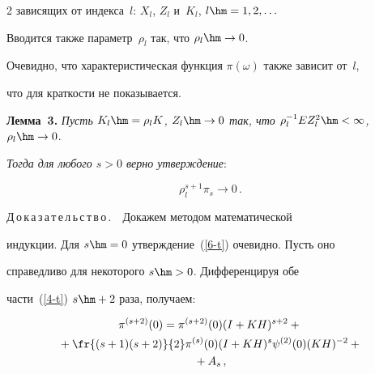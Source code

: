 \begin{multicols}{2}
зависящих от индекса~$l$: $X_l$, $Z_l$ и~$K_l$, $l\hm=1, 2,\ldots$

Вводится также параметр~$\rho_l$ так, что $\rho_l\hm\rightarrow 0$.

Очевидно, что характеристическая функция $\pi(\omega)$ также зависит от~$l$,

что для краткости не показывается.



\smallskip



\noindent

\textbf{Лемма~3.} \textit{Пусть $K_l\hm=\rho_l K$, $Z_l \hm\rightarrow 0$ так, что $\rho_l^{-1} EZ_l^2\hm < \infty$, $\rho_l\hm \rightarrow 0$}.



\textit{Тогда для любого $s > 0$ верно утверждение}:



\vspace*{2pt}



\noindent

\begin{equation}

\rho_l^{s+1}\pi_s\rightarrow 0\,.

\label{6-t}

\end{equation}



\noindent

 Д\,о\,к\,а\,з\,а\,т\,е\,л\,ь\,с\,т\,в\,о\,.\ \ Докажем методом математической

 индукции. Для $s\hm=0$ утверждение~(\ref{6-t}) очевидно. Пусть оно

 справедливо для некоторого $s\hm>0$. Дифференцируя обе

 части~(\ref{4-t}) $s\hm+2$ раза, получаем:



 \noindent

\begin{multline}

\pi^{(s+2)}(0)=\pi^{(s+2)}(0)(I+KH)^{s+2}+{}\\

{}+

\fr{(s+1)(s+2)}{2}\pi^{(s)}(0)(I+KH)^{s}\psi^{(2)}(0) (KH)^{-2}+{}\\

{}+A_s\,,

\label{7-t}

\end{multline}


\end{multicols}
